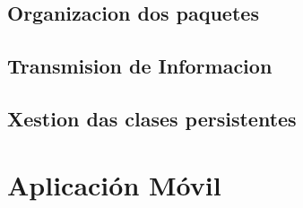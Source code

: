 \subsection{Organizacion dos paquetes}

\subsection{Transmision de Informacion}

\subsection{Xestion das clases persistentes}

\section{Aplicación Móvil}